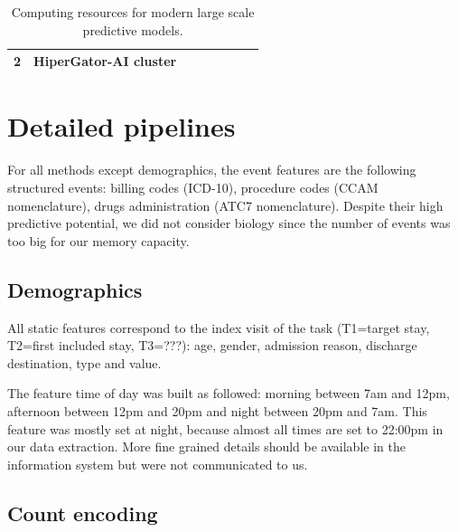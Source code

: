 \documentclass[french,12pt,twoside,a4paper]{book}
\begin{document}
\begin{appendices}
\begin{table}[]
{\begin{tabular}{llllllll}
        2                                                                                                                                                                 &
        HiperGator-AI cluster                                                                                                                                             &
        \cite{yang2022gatortron}                                                                                                                                            \\
        \bottomrule
      \end{tabular}%
    }
    \vspace{1em}
    \caption{Computing resources for modern large scale predictive models.}
    \label{table:computing_resource_review}
  \end{table}

  \section{Detailed pipelines}\label{apd:pipelines}

  For all methods except demographics, the event features are the following
  structured events: billing codes (ICD-10), procedure codes (CCAM nomenclature),
  drugs administration (ATC7 nomenclature). Despite their high predictive
  potential, we did not consider biology since the number of events was too big
  for our memory capacity.

  \subsection{Demographics}\label{apd:pipelines:demographics}

  All static features correspond to the index visit of the task (T1=target stay,
  T2=first included stay, T3=???): age, gender, admission reason, discharge destination,
  type and value.

  The feature time of day was built as followed: morning between 7am and 12pm,
  afternoon between 12pm and 20pm and night between 20pm and 7am. This feature was
  mostly set at night, because almost all times are set to 22:00pm in our data
  extraction. More fine grained details should be available in the information
  system but were not communicated to us.

  \subsection{Count encoding}\label{apd:pipelines:count_encoding}


\end{appendices}
\end{document}
